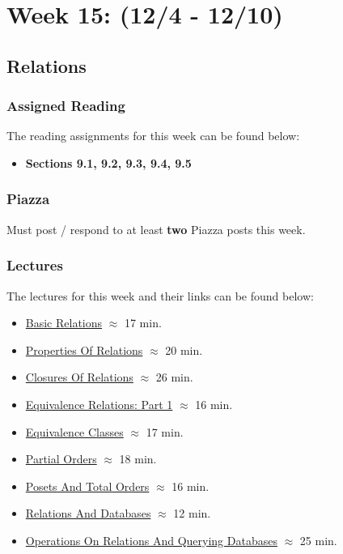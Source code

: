 \clearpage
\chapter{Week 15: (12/4 - 12/10)}

\section{Relations}

\subsection{Assigned Reading}

The reading assignments for this week can be found below:

\begin{itemize}
    \item \textbf{Sections 9.1, 9.2, 9.3, 9.4, 9.5}
\end{itemize}

\subsection{Piazza}

Must post / respond to at least \textbf{two} Piazza posts this week.  

\subsection{Lectures}

The lectures for this week and their links can be found below:

\begin{itemize}
    \item \href{https://applied.cs.colorado.edu/mod/hvp/view.php?id=51853}{Basic Relations} $\approx$ 17 min.
    \item \href{https://applied.cs.colorado.edu/mod/hvp/view.php?id=51854}{Properties Of Relations} $\approx$ 20 min.
    \item \href{https://applied.cs.colorado.edu/mod/hvp/view.php?id=51855}{Closures Of Relations} $\approx$ 26 min.
    \item \href{https://applied.cs.colorado.edu/mod/hvp/view.php?id=51856}{Equivalence Relations: Part 1} $\approx$ 16 min.
    \item \href{https://applied.cs.colorado.edu/mod/hvp/view.php?id=51857}{Equivalence Classes} $\approx$ 17 min.
    \item \href{https://applied.cs.colorado.edu/mod/hvp/view.php?id=51858}{Partial Orders} $\approx$ 18 min.
    \item \href{https://applied.cs.colorado.edu/mod/hvp/view.php?id=51859}{Posets And Total Orders} $\approx$ 16 min.
    \item \href{https://applied.cs.colorado.edu/mod/hvp/view.php?id=51860}{Relations And Databases} $\approx$ 12 min.
    \item \href{https://applied.cs.colorado.edu/mod/hvp/view.php?id=51861}{Operations On Relations And Querying Databases} $\approx$ 25 min.
\end{itemize}

